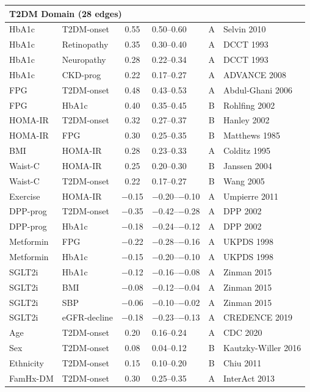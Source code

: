 \documentclass[runningheads]{llncs}
\begin{document}
{\begin{longtable}{@{}p{2.0cm}p{2.0cm}cp{1.4cm}cp{2.8cm}@{}}
\midrule
\multicolumn{6}{l}{\textbf{T2DM Domain (28 edges)}} \\
\midrule
HbA1c & T2DM-onset & 0.55 & 0.50--0.60 & A & Selvin 2010 \\
HbA1c & Retinopathy & 0.35 & 0.30--0.40 & A & DCCT 1993 \\
HbA1c & Neuropathy & 0.28 & 0.22--0.34 & A & DCCT 1993 \\
HbA1c & CKD-prog & 0.22 & 0.17--0.27 & A & ADVANCE 2008 \\
FPG & T2DM-onset & 0.48 & 0.43--0.53 & A & Abdul-Ghani 2006 \\
FPG & HbA1c & 0.40 & 0.35--0.45 & B & Rohlfing 2002 \\
HOMA-IR & T2DM-onset & 0.32 & 0.27--0.37 & B & Hanley 2002 \\
HOMA-IR & FPG & 0.30 & 0.25--0.35 & B & Matthews 1985 \\
BMI & HOMA-IR & 0.28 & 0.23--0.33 & A & Colditz 1995 \\
Waist-C & HOMA-IR & 0.25 & 0.20--0.30 & B & Janssen 2004 \\
Waist-C & T2DM-onset & 0.22 & 0.17--0.27 & B & Wang 2005 \\
Exercise & HOMA-IR & $-$0.15 & $-$0.20--$-$0.10 & A & Umpierre 2011 \\
DPP-prog & T2DM-onset & $-$0.35 & $-$0.42--$-$0.28 & A & DPP 2002 \\
DPP-prog & HbA1c & $-$0.18 & $-$0.24--$-$0.12 & A & DPP 2002 \\
Metformin & FPG & $-$0.22 & $-$0.28--$-$0.16 & A & UKPDS 1998 \\
Metformin & HbA1c & $-$0.15 & $-$0.20--$-$0.10 & A & UKPDS 1998 \\
SGLT2i & HbA1c & $-$0.12 & $-$0.16--$-$0.08 & A & Zinman 2015 \\
SGLT2i & BMI & $-$0.08 & $-$0.12--$-$0.04 & A & Zinman 2015 \\
SGLT2i & SBP & $-$0.06 & $-$0.10--$-$0.02 & A & Zinman 2015 \\
SGLT2i & eGFR-decline & $-$0.18 & $-$0.23--$-$0.13 & A & CREDENCE 2019 \\
Age & T2DM-onset & 0.20 & 0.16--0.24 & A & CDC 2020 \\
Sex & T2DM-onset & 0.08 & 0.04--0.12 & B & Kautzky-Willer 2016 \\
Ethnicity & T2DM-onset & 0.15 & 0.10--0.20 & B & Chiu 2011 \\
FamHx-DM & T2DM-onset & 0.30 & 0.25--0.35 & A & InterAct 2013 \\

\end{longtable}}
\end{document}

